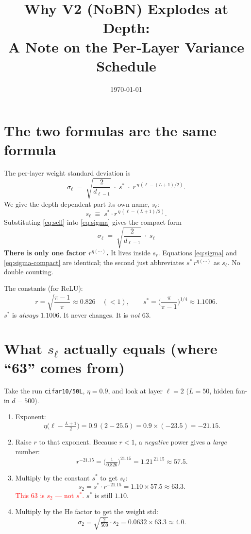 \documentclass[11pt]{article}
\title{Why V2 (NoBN) Explodes at Depth:\\ A Note on the Per-Layer Variance Schedule}
\author{}
\date{\today}
\newcommand{\sstar}{s^{*}}
\begin{document}
\maketitle

\section{The two formulas are the same formula}

The per-layer weight standard deviation is
\begin{equation}\label{eq:sigma}
  \sigma_\ell \;=\; \sqrt{\frac{2}{d_{\ell-1}}}\;\cdot\;\sstar\;\cdot\; r^{\,\eta\,(\ell - (L+1)/2)} .
\end{equation}
We give the depth-dependent part its own name, $s_\ell$:
\begin{equation}\label{eq:sell}
  s_\ell \;\equiv\; \sstar \cdot r^{\,\eta\,(\ell - (L+1)/2)} .
\end{equation}
Substituting \eqref{eq:sell} into \eqref{eq:sigma} gives the compact form
\begin{equation}\label{eq:sigma-compact}
  \boxed{\;\sigma_\ell \;=\; \sqrt{\frac{2}{d_{\ell-1}}}\;\cdot\; s_\ell\;}
\end{equation}
\textbf{There is only one factor $r^{\eta(\cdots)}$.} It lives inside $s_\ell$.
Equations \eqref{eq:sigma} and \eqref{eq:sigma-compact} are identical; the second
just abbreviates $\sstar\, r^{\eta(\cdots)}$ as $s_\ell$. No double counting.

\medskip
The constants (for ReLU):
\[
  r = \sqrt{\frac{\pi-1}{\pi}} \approx 0.826 \quad(<1), \qquad
  \sstar = \Big(\frac{\pi}{\pi-1}\Big)^{1/4} \approx 1.1006 .
\]
$\sstar$ is \emph{always} $1.1006$. It never changes. It is \emph{not} $63$.

\section{What $s_\ell$ actually equals (where ``63'' comes from)}

Take the run \texttt{cifar10/50L}, $\eta=0.9$, and look at layer $\ell=2$
($L=50$, hidden fan-in $d=500$).

\begin{enumerate}[label=\textbf{Step \arabic*.}, leftmargin=*]
  \item Exponent:
  \[
    \eta\Big(\ell - \tfrac{L+1}{2}\Big)
    = 0.9\,(2 - 25.5) = 0.9 \times (-23.5) = -21.15 .
  \]
  \item Raise $r$ to that exponent. Because $r<1$, a \emph{negative} power gives a
  \emph{large} number:
  \[
    r^{-21.15} = \Big(\tfrac{1}{0.826}\Big)^{21.15} = 1.21^{\,21.15} \approx 57.5 .
  \]
  \item Multiply by the constant $\sstar$ to get $s_\ell$:
  \[
    s_{2} = \sstar \cdot r^{-21.15} = 1.10 \times 57.5 \approx \mathbf{63.3}.
  \]
  \textcolor{red}{This $63$ is $s_2$ --- not $\sstar$.} $\sstar$ is still $1.10$.
  \item Multiply by the He factor to get the weight std:
  \[
    \sigma_2 = \sqrt{\tfrac{2}{500}}\cdot s_2 = 0.0632 \times 63.3 \approx \mathbf{4.0}.
  \]
\end{enumerate}
\end{document}

